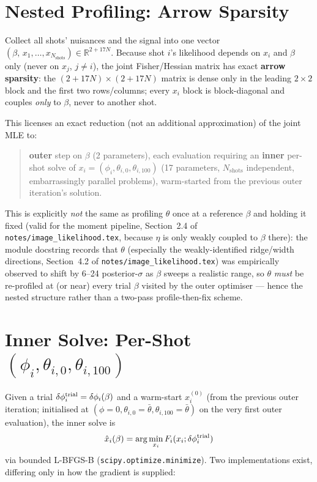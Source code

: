 \documentclass[11pt,a4paper]{article}
\newcommand{\R}{\mathbb{R}}
\newcommand{\code}[1]{\texttt{#1}}
\begin{document}
\section{Nested Profiling: Arrow Sparsity}
\label{sec:arrow}

Collect all shots' nuisances and the signal into one vector
$(\beta,\, x_1,\ldots,x_{N_\mathrm{shots}})\in\R^{2+17N}$. Because shot
$i$'s likelihood depends on $x_i$ and $\beta$ only (never on $x_j$,
$j\neq i$), the joint Fisher/Hessian matrix has exact \textbf{arrow
sparsity}: the $(2+17N)\times(2+17N)$ matrix is dense only in the leading
$2\times2$ block and the first two rows/columns; every $x_i$ block is
block-diagonal and couples \emph{only} to $\beta$, never to another shot.

This licenses an exact reduction (not an additional approximation) of the
joint MLE to:
\begin{quote}
  \textbf{outer} step on $\beta$ (2 parameters), each evaluation requiring
  an \textbf{inner} per-shot solve of $x_i=(\phi_i,\theta_{i,0},\theta_{i,100})$
  (17 parameters, $N_\mathrm{shots}$ independent, embarrassingly
  parallel problems), warm-started from the previous outer iteration's
  solution.
\end{quote}
This is explicitly \emph{not} the same as profiling $\theta$ once at a
reference $\beta$ and holding it fixed (valid for the moment pipeline,
Section~2.4 of \code{notes/image\_likelihood.tex}, because
$\eta$ is only weakly coupled to $\beta$ there): the module docstring
records that $\theta$ (especially the weakly-identified
ridge/width directions, Section~4.2 of \code{notes/image\_likelihood.tex})
was empirically observed to shift by 6--24 posterior-$\sigma$ as $\beta$
sweeps a realistic range, so $\theta$ \emph{must} be re-profiled at (or
near) every trial $\beta$ visited by the outer optimiser --- hence the
nested structure rather than a two-pass profile-then-fix scheme.

\section{Inner Solve: Per-Shot $(\phi_i,\theta_{i,0},\theta_{i,100})$}
\label{sec:inner}

Given a trial $\delta\phi_i^{\rm trial}=\delta\phi_i(\beta)$ and a warm-start
$x_i^{(0)}$ (from the previous outer iteration; initialised at
$(\phi=0,\theta_{i,0}=\bar\theta,\theta_{i,100}=\bar\theta)$ on the very
first outer evaluation), the inner solve is
\begin{equation}
  \hat x_i(\beta) = \arg\min_{x_i} F_i(x_i;\delta\phi_i^{\rm trial})
  \label{eq:inner}
\end{equation}
via bounded L-BFGS-B (\code{scipy.optimize.minimize}). Two implementations
exist, differing only in how the gradient is supplied:
\end{document}
